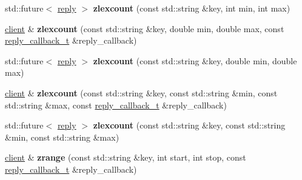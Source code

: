 \begin{DoxyCompactItemize}
\mbox{\label{classcpp__redis_1_1client_aff60a1181d93d961f6ca1903522ce899}} 
std\+::future$<$ \mbox{\hyperlink{classcpp__redis_1_1reply}{reply}} $>$ {\bfseries zlexcount} (const std\+::string \&key, int min, int max)
\item 
\mbox{\label{classcpp__redis_1_1client_aba1b2a6c750b13b1a632ebc8ca90cf60}} 
\mbox{\hyperlink{classcpp__redis_1_1client}{client}} \& {\bfseries zlexcount} (const std\+::string \&key, double min, double max, const \mbox{\hyperlink{classcpp__redis_1_1client_af7a65eb21aa25230bfbb0b0203c4fc04}{reply\+\_\+callback\+\_\+t}} \&reply\+\_\+callback)
\item 
\mbox{\label{classcpp__redis_1_1client_ab492b901c49f913d0120b87afee9458c}} 
std\+::future$<$ \mbox{\hyperlink{classcpp__redis_1_1reply}{reply}} $>$ {\bfseries zlexcount} (const std\+::string \&key, double min, double max)
\item 
\mbox{\label{classcpp__redis_1_1client_a90bd86c8348ca8bfec29d66d9e5bdfc3}} 
\mbox{\hyperlink{classcpp__redis_1_1client}{client}} \& {\bfseries zlexcount} (const std\+::string \&key, const std\+::string \&min, const std\+::string \&max, const \mbox{\hyperlink{classcpp__redis_1_1client_af7a65eb21aa25230bfbb0b0203c4fc04}{reply\+\_\+callback\+\_\+t}} \&reply\+\_\+callback)
\item 
\mbox{\label{classcpp__redis_1_1client_ace7bbf92a0ea2cac775e5bc66a0d1ea8}} 
std\+::future$<$ \mbox{\hyperlink{classcpp__redis_1_1reply}{reply}} $>$ {\bfseries zlexcount} (const std\+::string \&key, const std\+::string \&min, const std\+::string \&max)
\item 
\mbox{\label{classcpp__redis_1_1client_a70025f24f20e81397868467651c804a9}} 
\mbox{\hyperlink{classcpp__redis_1_1client}{client}} \& {\bfseries zrange} (const std\+::string \&key, int start, int stop, const \mbox{\hyperlink{classcpp__redis_1_1client_af7a65eb21aa25230bfbb0b0203c4fc04}{reply\+\_\+callback\+\_\+t}} \&reply\+\_\+callback)
\item 
\mbox{\label{classcpp__redis_1_1client_a7a86805d2495c3866df9095ea71ab842}} 

\end{DoxyCompactItemize}
